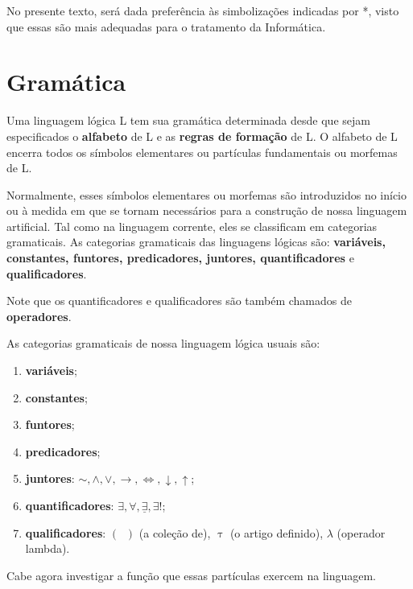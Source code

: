 No presente texto, será dada preferência às simbolizações indicadas por *, visto que essas são mais adequadas para o tratamento da Informática.

\newpage

\section{Gramática}
\setcounter{exemplo}{0}

Uma linguagem lógica L tem sua gramática determinada desde que sejam especificados o \textbf{alfabeto} de L e as \textbf{regras de formação} de L.
O alfabeto de L encerra todos os símbolos elementares ou partículas fundamentais ou morfemas de L.

Normalmente, esses símbolos elementares ou morfemas são introduzidos no início ou à medida em que se tornam necessários para a construção de nossa linguagem artificial.
Tal como na linguagem corrente, eles se classificam em categorias gramaticais.
As categorias gramaticais das linguagens lógicas são: \textbf{variáveis, constantes, funtores, predicadores, juntores, quantificadores} e \textbf{qualificadores}.

Note que os quantificadores e qualificadores são também chamados de \textbf{operadores}.

As categorias gramaticais de nossa linguagem lógica usuais são:

\begin{enumerate}
    \item \textbf{variáveis};
    \item \textbf{constantes};
    \item \textbf{funtores};
    \item \textbf{predicadores};
    \item \textbf{juntores}: $\sim, \land, \lor, \to, \iff, \downarrow, \uparrow$;
    \item \textbf{quantificadores}: $\exists, \forall, \underline{\exists}, \exists!$;
    \item \textbf{qualificadores}: $(\;\;)$ (a coleção de), $\uptau$ (o artigo definido), $\lambda$ (operador lambda).
\end{enumerate}

Cabe agora investigar a função que essas partículas exercem na linguagem.

